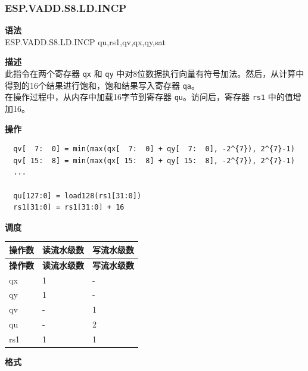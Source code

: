 \newpage

\newpage
\subsubsection{ESP.VADD.S8.LD.INCP}\label{instruction:ESPVADDS8LDINCP}
\textbf{语法}\\
ESP.VADD.S8.LD.INCP qu,rs1,qv,qx,qy,sat

\textbf{描述}\\
此指令在两个寄存器 \lstinline{qx} 和 \lstinline{qy} 中对8位数据执行向量有符号加法。然后，从计算中得到的16个结果进行饱和，饱和结果写入寄存器 \lstinline{qa}。\\ 在操作过程中，从内存中加载16字节到寄存器 \lstinline{qu}。访问后，寄存器 \lstinline{rs1} 中的值增加16。

\textbf{操作}\\
\begin{lstlisting}
  qv[  7:  0] = min(max(qx[  7:  0] + qy[  7:  0], -2^{7}), 2^{7}-1)
  qv[ 15:  8] = min(max(qx[ 15:  8] + qy[ 15:  8], -2^{7}), 2^{7}-1)
  ...

  qu[127:0] = load128(rs1[31:0])
  rs1[31:0] = rs1[31:0] + 16
\end{lstlisting}


\textbf{调度}\\
\begin{longtable}[c]{|l|l|l|}
    \hline
    \rowcolor{lightgray}
    \textbf{操作数} & \textbf{读流水级数} & \textbf{写流水级数} \\\hline
    \endfirsthead
    \hline
    \rowcolor{lightgray}
     \textbf{操作数} & \textbf{读流水级数} & \textbf{写流水级数} \\\hline
    \endhead
    \hline
    \endfoot

    qx & 1 & - \\\hline
  qy & 1 & - \\\hline
     qv & - & 1 \\\hline
     qu & - & 2 \\\hline
     rs1 & 1 & 1

\end{longtable}

\textbf{格式}\\


